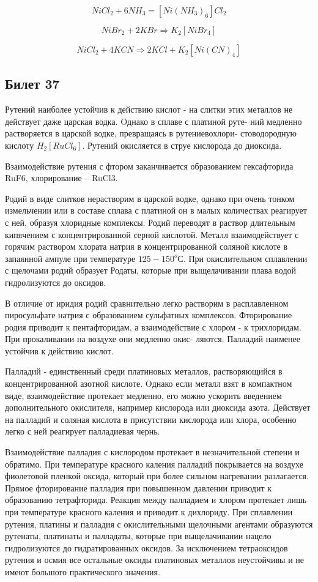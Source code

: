 \documentclass[11pt]{article}
\begin{document}
$$NiCl_2  + 6NH_3 = [Ni(NH_3)_6]Cl_2$$

$$NiBr_2 + 2KBr \Rightarrow K_2[NiBr_4]$$

$$NiCl_2 + 4KCN \Rightarrow 2KCl + K_2[Ni(CN)_4]$$



\subsection{Билет 37}

Рутений наиболее устойчив к действию кислот - на слитки этих
металлов не действует даже царская водка. Oднако в сплаве с платиной руте-
ний медленно растворяется в царской водке, превращаясь в рутениевохлори-
стоводородную кислоту $H_2[RuCl_6]$. Рутений окисляется в струе кислорода до диоксида. 

Взаимодействие рутения с фтором заканчивается образованием
гексафторида RuF6, хлорирование – RuCl3.

Родий в виде слитков нерастворим в царской водке, однако
при очень тонком измельчении или в составе сплава с платиной он в малых
количествах реагирует с ней, образуя хлоридные комплексы. Родий переводят в раствор длительным кипячением с концентрированной серной кислотой. Металл взаимодействует с горячим раствором хлората натрия в концентрированной соляной кислоте в запаянной ампуле при температуре $125-150 ^oС$. При окислительном сплавлении с щелочами родий образует Родаты, которые при выщелачивании плава водой гидролизуются
до оксидов.

 В отличие от иридия родий сравнительно легко растворим в расплавленном пиросульфате натрия с образованием сульфатных комплексов. Фторирование родия приводит к пентафторидам, а взаимодействие с
хлором - к трихлоридам. При прокаливании на воздухе они медленно окис-
ляются. Палладий наименее устойчив к действию кислот. 

Палладий - единственный среди платиновых металлов, растворяющийся в концентрированной азотной кислоте. Oднако если металл взят в компактном виде,
взаимодействие протекает медленно, его можно ускорить введением дополнительного окислителя, например кислорода или диоксида азота. Действует
на палладий и соляная кислота в присутствии кислорода или хлора, особенно
легко с ней реагирует палладиевая чернь.

Взаимодействие палладия с кислородом протекает в незначительной степени и обратимо. При температуре красного каления палладий покрывается на воздухе фиолетовой пленкой оксида, который при более сильном нагревании разлагается. Прямое фторирование палладия при повышенном давлении приводит к
образованию тетрафторида. Реакция между палладием и хлором протекает лишь при
температуре красного каления и приводит к дихлориду. При сплавлении рутения, платины
и палладия с окислительными щелочными агентами образуются рутенаты, платинаты и
палладаты, которые при выщелачивании нацело гидролизуются до гидратированных
оксидов. За исключением тетраоксидов рутения и осмия все остальные оксиды
платиновых металлов неустойчивы и не имеют большого практического значения.
\end{document}
